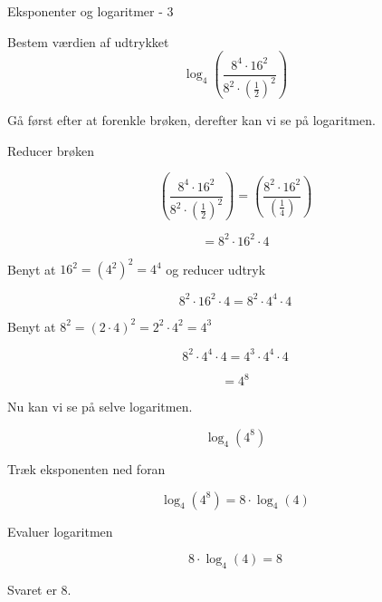 \documentclass{article}
\begin{document}
\begin{exercise}{Eksponenter og logaritmer - 3}

Bestem værdien af udtrykket
\[
\log_4\left(\frac{8^4 \cdot 16^2}{8^2 \cdot \left(\frac{1}{2} \right)^2} \right)
\]


\hint
Gå først efter at forenkle brøken, derefter kan vi se på logaritmen.

\hint
Reducer brøken

\hint
\[
\left(\frac{8^4 \cdot 16^2}{8^2 \cdot \left(\frac{1}{2} \right)^2} \right) = \left(\frac{8^2 \cdot 16^2}{ \left(\frac{1}{4} \right)} \right)
\]

\hint
\[
= 8^2 \cdot 16^2 \cdot 4
\]

\hint
Benyt at $16^2=(4^2)^2 = 4^4$ og reducer udtryk

\hint
\[
8^2 \cdot 16^2 \cdot 4 = 8^2 \cdot 4^4 \cdot 4
\]

\hint
Benyt at $8^2 = (2 \cdot 4)^2 = 2^2 \cdot 4^2 = 4^3$

\hint
\[
8^2 \cdot 4^4 \cdot 4 = 4^3 \cdot 4^4 \cdot 4
\]

\hint
\[
= 4^8
\]

\hint
Nu kan vi se på selve logaritmen.

\hint
\[
\log_4\left(4^8\right)
\]


\hint
Træk eksponenten ned foran

\hint
\[
\log_4\left(4^{8}\right) = 8 \cdot \log_4(4)
\]

\hint
Evaluer logaritmen

\hint
\[
8 \cdot \log_4(4) = 8
\]

\hint
Svaret er $8$.

\end{exercise}
\end{document}
